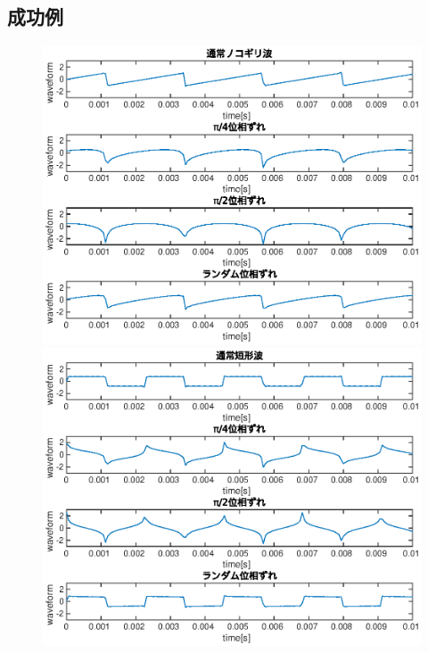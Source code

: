 \subsection{成功例}
\begin{figure}[H]
  \centering
  \begin{minipage}{0.45\linewidth}
    \includegraphics[scale=0.4]{../eps/kadai1_1.eps}
  \end{minipage}
  \begin{minipage}{0.45\linewidth}
    \centering
    \includegraphics[scale=0.4]{../eps/kadai1_2.eps}
  \end{minipage}
\end{figure}

\clearpage
